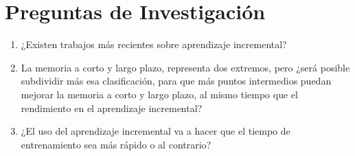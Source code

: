 \chapter{Preguntas de Investigación}

\begin{enumerate}
  \item ¿Existen trabajos más recientes sobre aprendizaje incremental?
  \item La memoria a corto y largo plazo, representa dos extremos, pero ¿será posible subdividir más esa clasificación, para que más puntos intermedios puedan mejorar la memoria a corto y largo plazo, al mismo tiempo que el rendimiento en el aprendizaje incremental?
  \item ¿El uso del aprendizaje incremental va a hacer que el tiempo de entrenamiento sea  m\'as r\'apido o al contrario?
\end{enumerate}